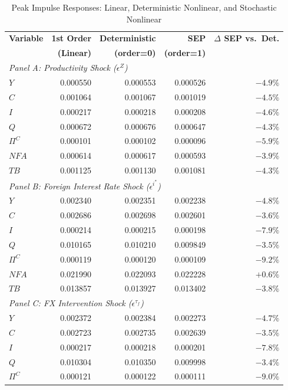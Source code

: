 \documentclass[12pt]{article}
\begin{document}
\begin{table}[H]
\centering
\caption{Peak Impulse Responses: Linear, Deterministic Nonlinear, and Stochastic Nonlinear}\label{tab:irf_comparison}
\small
\begin{tabular}{lrrrr}
\toprule
\textbf{Variable} & \textbf{1st Order} & \textbf{Deterministic} & \textbf{SEP} & \textbf{$\Delta$ SEP vs.\ Det.} \\
 & \textbf{(Linear)} & \textbf{(order=0)} & \textbf{(order=1)} & \\
\midrule
\multicolumn{5}{l}{\textit{Panel A: Productivity Shock ($\epsilon^Z$)}} \\
$Y$ & 0.000550 & 0.000553 & 0.000526 & $-4.9\%$ \\
$C$ & 0.001064 & 0.001067 & 0.001019 & $-4.5\%$ \\
$I$ & 0.000217 & 0.000218 & 0.000208 & $-4.6\%$ \\
$Q$ & 0.000672 & 0.000676 & 0.000647 & $-4.3\%$ \\
$\Pi^C$ & 0.000101 & 0.000102 & 0.000096 & $-5.9\%$ \\
$NFA$ & 0.000614 & 0.000617 & 0.000593 & $-3.9\%$ \\
$TB$ & 0.001125 & 0.001130 & 0.001081 & $-4.3\%$ \\
\midrule
\multicolumn{5}{l}{\textit{Panel B: Foreign Interest Rate Shock ($\epsilon^{i^*}$)}} \\
$Y$ & 0.002340 & 0.002351 & 0.002238 & $-4.8\%$ \\
$C$ & 0.002686 & 0.002698 & 0.002601 & $-3.6\%$ \\
$I$ & 0.000214 & 0.000215 & 0.000198 & $-7.9\%$ \\
$Q$ & 0.010165 & 0.010210 & 0.009849 & $-3.5\%$ \\
$\Pi^C$ & 0.000119 & 0.000120 & 0.000109 & $-9.2\%$ \\
$NFA$ & 0.021990 & 0.022093 & 0.022228 & $+0.6\%$ \\
$TB$ & 0.013857 & 0.013927 & 0.013402 & $-3.8\%$ \\
\midrule
\multicolumn{5}{l}{\textit{Panel C: FX Intervention Shock ($\epsilon^{\tau_f}$)}} \\
$Y$ & 0.002372 & 0.002384 & 0.002273 & $-4.7\%$ \\
$C$ & 0.002723 & 0.002735 & 0.002639 & $-3.5\%$ \\
$I$ & 0.000217 & 0.000218 & 0.000201 & $-7.8\%$ \\
$Q$ & 0.010304 & 0.010350 & 0.009998 & $-3.4\%$ \\
$\Pi^C$ & 0.000121 & 0.000122 & 0.000111 & $-9.0\%$ \\

\end{tabular}
\end{table}
\end{document}

